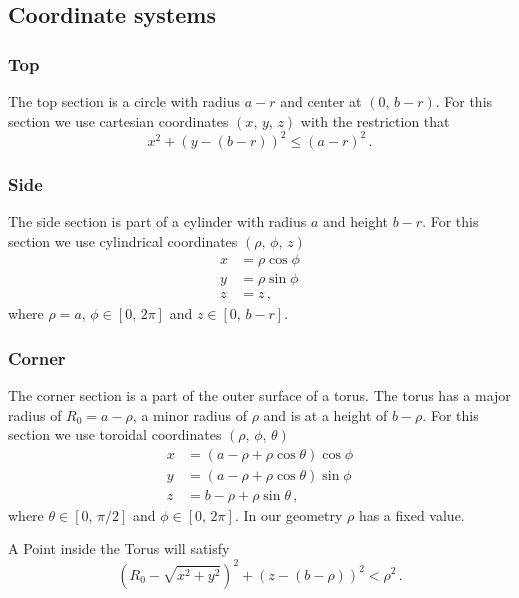 \documentclass[a4paper,10pt]{article}
\numberwithin{equation}{section}
\begin{document}
\subsection{Coordinate systems}
\subsubsection{Top}
The top section is a circle with radius \(a-r\) and center at \((0,\, b-r)\). For this section we use cartesian coordinates \((x,\, y,\, z)\) with the restriction that
\begin{equation}
  x^2 + \left( y - (b - r) \right)^2 \leq (a-r)^2\, .
\end{equation}

\subsubsection{Side}
The side section is part of a cylinder with radius \(a\) and height \(b-r\). For this section we use cylindrical coordinates \((\rho,\, \phi,\, z)\)
\begin{align}
  x &= \rho \cos{\phi}\\
  y &= \rho \sin{\phi}\\
  z &= z\, ,
\end{align}
where \(\rho = a\), \(\phi \in [0,\, 2\pi]\) and \(z \in [0,\, b-r]\).

\subsubsection{Corner}
The corner section is a part of the outer surface of a torus. The torus has a major radius of \(R_0 = a-\rho\), a minor radius of \(\rho\) and is at a height of \(b-\rho\).
For this section we use toroidal coordinates \((\rho,\, \phi,\, \theta)\)
\begin{align}\label{eq:toroidal_coordinates}
  x &= \left( a - \rho + \rho\cos{\theta} \right) \cos{\phi}\\
  y &= \left( a - \rho + \rho\cos{\theta} \right)\sin{\phi}\\
  z &= b - \rho + \rho\sin{\theta}\, ,
\end{align}
where \(\theta \in [0,\, \pi/2]\) and \(\phi \in [0,\, 2\pi]\). In our geometry \(\rho\) has a fixed value.

A Point inside the Torus will satisfy
\begin{equation}
  \left( R_0 - \sqrt{x^2 + y^2} \right)^2 + \left( z - (b - \rho)\right)^2 < \rho^2\, .
\end{equation}
%
\end{document}
